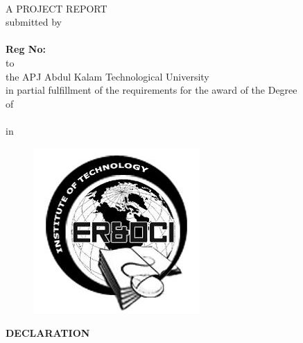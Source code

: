 \documentclass[12pt,a4paper]{report}
\begin{document}
\thispagestyle{empty}
\begin{center}
{\Large{\textbf{\projectnameb{}}}}
\vspace{5mm}
\\A PROJECT REPORT
\vspace{5mm}
\\submitted by
\vspace{5mm}
\\ \dept{} 
\\{\textbf{Reg No:\roll{}}}
\vspace{5mm}
\\to
\\the APJ Abdul Kalam Technological University
\\in partial fulfillment of the requirements for the award of the Degree
\\of
\\ \degree{}
\\in
\\ \stream{}
\end{center}

\begin{figure}[ht]
\centering
\includegraphics[scale=0.5]{logo}
\end{figure}

\begin{center}
{\dept{}
\vspace{5mm}
\insti{}}
\end{center}

\newpage
\thispagestyle{empty}

\begin{center}
\textbf{DECLARATION}
\end{center}
\end{document}
